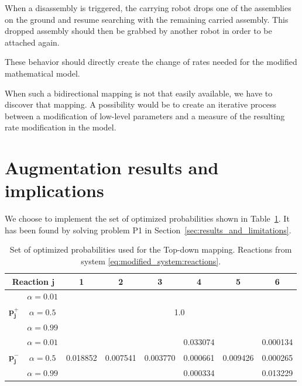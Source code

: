 	When a disassembly is triggered, the carrying robot drops one of the assemblies on the ground and resume searching with the remaining carried assembly. This dropped assembly should then be grabbed by another robot in order to be attached again.
	
	These behavior should directly create the change of rates needed for the modified mathematical model.
	
	When such a bidirectional mapping is not that easily available, we have to discover that mapping. A possibility would be to create an iterative process between a modification of low-level parameters and a measure of the resulting rate modification in the model.

\section{Augmentation results and implications} %
\label{sec:augmentation_results_and_implications}

	We choose to implement the set of optimized probabilities shown in Table~\ref{tab:optimized_probabilities_augmented}. It has been found by solving problem P1 in Section~\ref{sec:results_and_limitations}.
	
	\begin{table}
		\begin{center}
		\begin{tabular}{|c|c|c|c|c|c|c|c|}
			\hline
			\multicolumn{2}{|c|}{\textbf{Reaction} $\mathbf{j}$} & \textbf{1} & \textbf{2} & \textbf{3} & \textbf{4} & \textbf{5} & \textbf{6} \\
			\hline
			 	& $\alpha = 0.01$ & \multicolumn{6}{c|}{} \\
			$\mathbf{p^+_j}$ & $\alpha = 0.5$ & \multicolumn{6}{c|}{1.0} \\
				& $\alpha = 0.99$ & \multicolumn{6}{c|}{} \\
			\hline
			& $\alpha = 0.01$ &  &  &  & 0.033074 &  & 0.000134 \\
			$\mathbf{p^-_j}$ & $\alpha = 0.5$ & 0.018852 & 0.007541 & 0.003770 & 0.000661 & 0.009426 & 0.000265 \\
			& $\alpha = 0.99$ &  &  &  &  0.000334 &  & 0.013229 \\
			\hline
		\end{tabular}
		\end{center}
		\caption{Set of optimized probabilities used for the Top-down mapping. Reactions from system \eqref{eq:modified_system:reactions}.}
		\label{tab:optimized_probabilities_augmented}
	\end{table}
	
